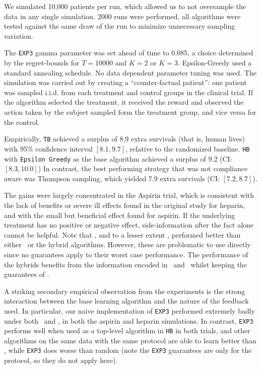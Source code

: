 We simulated 10,000 patients per run, which allowed us to not oversample the data in any single simulation. 2000 runs were performed, all algorithms were tested against the same draw of the run to minimize unnecessary sampling variation. 

The \texttt{EXP3} gamma parameter was set ahead of time to 0.085, a choice determined by the regret-bounds for $T=10000$ and $K=2$ or $K=3$. Epsilon-Greedy used a standard annealing schedule. No data dependent parameter tuning was used.
The simulation was carried out by creating a ``counter-factual patient'': one patient was sampled i.i.d. from each treatment and control groups in the clinical trial. If the algorithm selected the treatment, it received the reward and observed the action taken by the subject sampled form the treatment group, and vice versa for the control.


Empirically, \texttt{TB} achieved a surplus of 8.9 extra survivals (that is, human lives) with 95\% confidence interval $[8.1,9.7]$, relative to the randomized baseline.
\texttt{HB} with \texttt{Epsilon Greedy} as the base algorithm achieved a surplus of 9.2 (CI: $[8.3,10.0]$)
In contrast, the best performing strategy that was not compliance aware was Thompson sampling, which yielded 7.9 extra survivals (CI: $[7.2,8.7]$). 

The gains were largely concentrated in the Aspirin trial, which is consistent with the lack of benefits or severe ill effects found in the original study \cite{ist:97} for heparin, and with the small but beneficial effect found for aspirin. 
If the underlying treatment has no positive or negative effect, side-information after the fact alone cannot be helpful.
Note that \actual, and to a lesser extent \comply, performed better than either \chosen\, or the hybrid algorithms. However, these are problematic to use directly since no guarantees apply to their worst case performance. The performance of the hybrids benefits from the information encoded in \actual\, and \comply\, whilst keeping the guarantees of \chosen. 


A striking secondary empirical observation from the experiments is the strong interaction between the base learning algorithm and the nature of the feedback used. In particular, our naive implementation of \texttt{EXP3} performed extremely badly under both \actual\, and \comply, in both the aspirin and heparin simulations. In contrast, \texttt{EXP3} performs well when used as a top-level algorithm in \texttt{HB} in both trials, and other algorithms on the same data with the same protocol are able to learn better than \chosen, while \texttt{EXP3} does worse than random (note the \texttt{EXP3} guarantees are only for the \chosen\, protocol, so they do not apply here).



